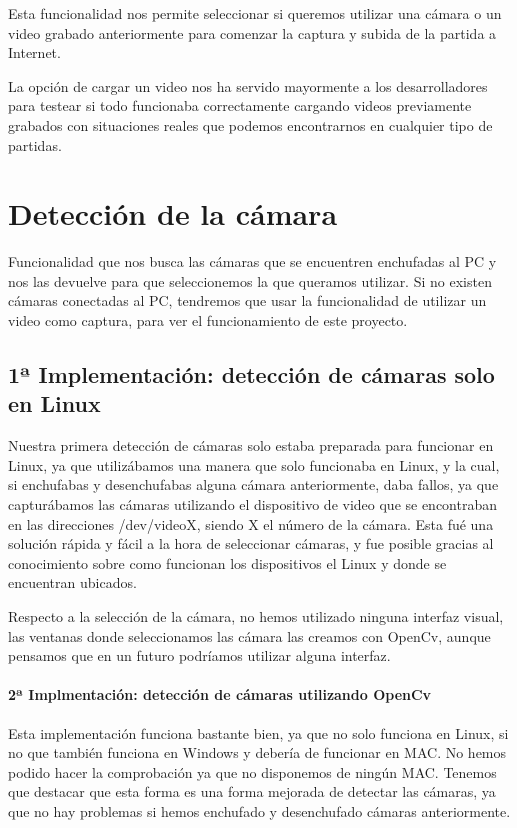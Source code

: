 \documentclass[12pt,a4paper]{report}
\begin{document}
Esta funcionalidad nos permite seleccionar si queremos utilizar una cámara o un
video grabado anteriormente para comenzar la captura y subida de la partida a
Internet.

La opción de cargar un video nos ha servido mayormente a los desarrolladores
para testear si todo funcionaba correctamente cargando videos previamente
grabados con situaciones reales que podemos encontrarnos en cualquier tipo de
partidas. 


\section{Detección de la cámara} 

Funcionalidad que nos busca las cámaras que se encuentren enchufadas al PC y nos
las devuelve para que seleccionemos la que queramos utilizar. Si no existen
cámaras conectadas al PC, tendremos que usar la funcionalidad de utilizar un
video como captura, para ver el funcionamiento de este proyecto.  

\subsection{1ª Implementación: detección de cámaras solo en Linux}

Nuestra primera detección de cámaras solo estaba preparada para funcionar en
Linux, ya que utilizábamos una manera que solo funcionaba en Linux, y la cual,
si enchufabas y desenchufabas alguna cámara anteriormente, daba fallos, ya que
capturábamos las cámaras utilizando el dispositivo de video que se encontraban
en las direcciones /dev/videoX, siendo X el número de la cámara. Esta fué una
solución rápida y fácil a la hora de seleccionar cámaras, y fue posible gracias
al conocimiento sobre como funcionan los dispositivos el Linux y donde se
encuentran ubicados. 

Respecto a la selección de la cámara, no hemos utilizado ninguna interfaz
visual, las ventanas donde seleccionamos las cámara las creamos con OpenCv,
aunque pensamos que en un futuro podríamos utilizar alguna interfaz. 

\paragraph{2ª Implmentación: detección de cámaras utilizando OpenCv}

Esta implementación funciona bastante bien, ya que no solo funciona en Linux, si
no que también funciona en Windows y debería de funcionar en MAC. No hemos
podido hacer la comprobación ya que no disponemos de ningún MAC. Tenemos que
destacar que esta forma es una forma mejorada de detectar las cámaras, ya que no
hay problemas si hemos enchufado y desenchufado cámaras anteriormente.  
\end{document}
